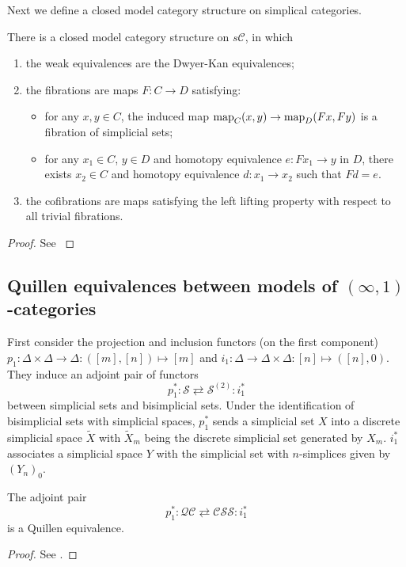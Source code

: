 \begin{refsection}
Next we define a closed model category structure on simplical categories.
\begin{thm}
There is a closed model category structure on $s\mathcal{C}$, in which
\begin{enumerate}
\item the weak equivalences are the Dwyer-Kan equivalences;
\item the fibrations are maps $F:C\to D$ satisfying:
\begin{itemize}
\item for any $x,y\in C$, the induced map $\operatorname{\mathrm{map}}_C(x,y)\to\operatorname{\mathrm{map}}_D(Fx,Fy)$ is a fibration of simplicial sets;
\item for any $x_1\in C$, $y\in D$ and homotopy equivalence $e:Fx_1\to y$ in $D$, there exists $x_2\in C$ and homotopy equivalence $d:x_1\to x_2$ such that $Fd=e$.
\end{itemize}
\item the cofibrations are maps satisfying the left lifting property with respect to all trivial fibrations.
\end{enumerate}
\end{thm}

\begin{proof}
See \cite{bergner4}
\end{proof}

\subsection{Quillen equivalences between models of $(\infty,1)$-categories}

First consider the projection and inclusion functors (on the first component) $p_1:\Delta\times\Delta\to\Delta:([m],[n])\mapsto[m]$ and $i_1:\Delta\to\Delta\times\Delta:[n]\mapsto([n],0)$. They induce an adjoint pair of functors
$$p_1^*:\mathcal S\rightleftarrows\mathcal S^{(2)}:i_1^*$$
between simplicial sets and bisimplicial sets. Under the identification of bisimplicial sets with simplicial spaces, $p_1^*$ sends a simplicial set $X$ into a discrete simplicial space $\tilde X$ with $\tilde X_m$ being the discrete simplicial set generated by $X_m$. $i_1^*$ associates a simplicial space $Y$ with the simplicial set with $n$-simplices given by $(Y_n)_0$.

\begin{thm}
The adjoint pair
$$p_1^*:\mathcal{QC}\rightleftarrows\mathcal{CSS}:i_1^*$$
is a Quillen equivalence.
\end{thm}

\begin{proof}
See \cite{jt}.
\end{proof}


\end{refsection}
